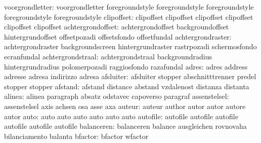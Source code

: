           voorgrondletter: voorgrondletter           foregroundstyle
                           foregroundstyle           foregroundstyle
                           foregroundstyle           foregroundstyle
clipoffset: clipoffset   clipoffset
            clipoffset   clipoffset
            clipoffset   clipoffset
        achtergrondoffset: achtergrondoffset         backgroundoffset
                           hintergrundoffset         offsetpozadi
                           offsetsfondo              offsetfundal
        achtergrondraster: achtergrondraster         backgroundscreen
                           hintergrundraster         rastrpozadi
                           schermosfondo             ecranfundal
        achtergrondstraal: achtergrondstraal         backgroundradius
                           hintergrundradius         polomerpozadi
                           raggiosfondo              razafundal
                    adres: adres                     address
                           adresse                   adresa
                           indirizzo                 adresa
                afsluiter: afsluiter                 stopper
                           abschnitttrenner          predel
                           stopper                   stopper
                  afstand: afstand                   distance
                           abstand                   vzdalenost
                           distanza                  distanta
                   alinea: alinea                    paragraph
                           absatz                    odstavec
                           capoverso                 paragraf
             assenstelsel: assenstelsel              axis
                           achsen                    osa
                           asse                      axa
                   auteur: auteur                    author
                           autor                     autor
                           autore                    autor
                     auto: auto                      auto
                           auto                      auto
                           auto                      auto
                 autofile: autofile                  autofile
                           autofile                  autofile
                           autofile                  autofile %
               balanceren: balanceren                balance
                           ausgleichen               rovnovaha
                           bilanciamento             balanta
                  bfactor: bfactor                   wfactor
